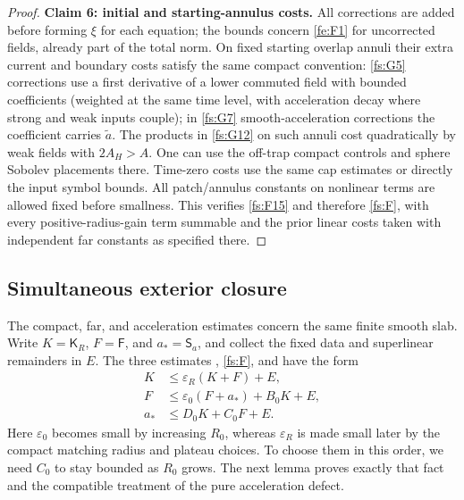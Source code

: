 \begin{proof}
\par\medskip\noindent\textbf{Claim 6: initial and starting-annulus costs.}\label{fs:claim-boundary}\quad
All corrections are added before forming \(\xi\) for each equation; the bounds concern \eqref{fe:F1} for uncorrected fields, already part of the total norm. On fixed starting overlap annuli their extra current and boundary costs satisfy the same compact convention: \eqref{fs:G5} corrections use a first derivative of a lower commuted field with bounded coefficients (weighted at the same time level, with acceleration decay where strong and weak inputs couple); in \eqref{fs:G7} smooth-acceleration corrections the coefficient carries \(\widetilde a\). The products in \eqref{fs:G12} on such annuli cost quadratically by weak fields with \(2A_H>A\). One can use the off-trap compact controls and sphere Sobolev placements there. Time-zero costs use the same cap estimates or directly the input symbol bounds. All patch/annulus constants on nonlinear terms are allowed fixed before smallness. This verifies \eqref{fs:F15} and therefore \eqref{fs:F}, with every positive-radius-gain term summable and the prior linear costs taken with independent far constants as specified there.

\end{proof}

\subsection{Simultaneous exterior closure}

The compact, far, and acceleration estimates concern the same finite
smooth slab.  Write $K=\mathsf K_R$, $F=\mathsf F$, and
$a_*=\mathsf S_a$, and collect the fixed data and superlinear
remainders in $E$.  The three estimates , \eqref{fs:F},
and  have the form
\begin{equation}\label{fs:coupled-inequalities}
 \begin{split}
 K&\le\varepsilon_R(K+F)+E,\\
 F&\le\varepsilon_0(F+a_*)+B_0K+E,\\
 a_*&\le D_0K+C_0F+E .
 \end{split}
\end{equation}
Here $\varepsilon_0$ becomes small by increasing $R_0$, whereas
$\varepsilon_R$ is made small later by the compact matching radius
and plateau choices.  To choose them in this order, we need $C_0$
to stay bounded as $R_0$ grows.  The next lemma proves exactly that
fact and the compatible treatment of the pure acceleration defect.

